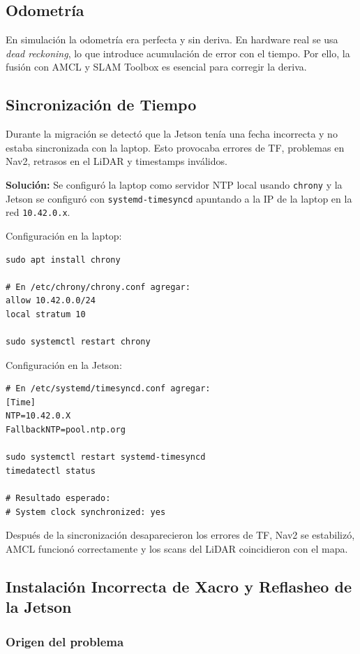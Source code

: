 \documentclass[conference]{IEEEtran}
\begin{document}
\subsection{Odometría}
En simulación la odometría era perfecta y sin deriva. En hardware real se usa
\textit{dead reckoning}, lo que introduce acumulación de error con el tiempo.
Por ello, la fusión con AMCL y SLAM Toolbox es esencial para corregir la deriva.

\subsection{Sincronización de Tiempo}
Durante la migración se detectó que la Jetson tenía una fecha incorrecta y no
estaba sincronizada con la laptop. Esto provocaba errores de TF, problemas en
Nav2, retrasos en el LiDAR y timestamps inválidos.

\textbf{Solución:} Se configuró la laptop como servidor NTP local usando
\texttt{chrony} y la Jetson se configuró con \texttt{systemd-timesyncd}
apuntando a la IP de la laptop en la red \texttt{10.42.0.x}.

Configuración en la laptop:

\begin{lstlisting}
sudo apt install chrony

# En /etc/chrony/chrony.conf agregar:
allow 10.42.0.0/24
local stratum 10

sudo systemctl restart chrony
\end{lstlisting}

Configuración en la Jetson:

\begin{lstlisting}
# En /etc/systemd/timesyncd.conf agregar:
[Time]
NTP=10.42.0.X
FallbackNTP=pool.ntp.org

sudo systemctl restart systemd-timesyncd
timedatectl status

# Resultado esperado:
# System clock synchronized: yes
\end{lstlisting}

Después de la sincronización desaparecieron los errores de TF, Nav2 se
estabilizó, AMCL funcionó correctamente y los scans del LiDAR coincidieron
con el mapa.

\subsection{Instalación Incorrecta de Xacro y Reflasheo de la Jetson}

\subsubsection{Origen del problema}
\end{document}
